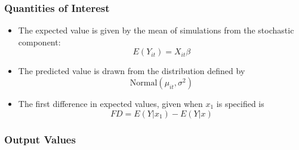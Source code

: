 \subsubsection{Quantities of Interest}
\begin{itemize}
\item 
The expected value is given by the mean of simulations from the stochastic component:
\[E(Y_{it}) = X_{it}\beta\]
\item The predicted value is drawn from the distribution defined by 
\[\mathrm{Normal}(\mu_{it}, \sigma^2)\]
\item The first difference in expected values, given when \(x_1\) is specified is
\[FD = E(Y|x_1) - E(Y|x)\]
\end{itemize}


\subsubsection{Output Values}
